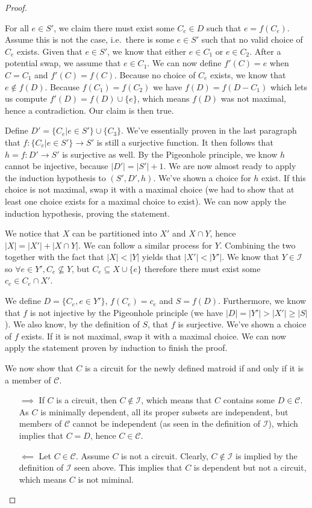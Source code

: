 \begin{proof}
\begin{enumerate}
\begin{enumerate}
            For all $e \in S'$, we claim there must exist some $C_e \in D$ such that $e = f(C_e)$. Assume this is not the case, i.e.\ there is some $e \in S'$ such that no valid choice of $C_e$ exists. Given that $e \in S'$, we know that either $e \in C_1$ or $e \in C_2$. After a potential swap, we assume that $e \in C_1$. We can now define $f'(C) = e$ when $C = C_1$ and $f'(C) = f(C)$. Because no choice of $C_e$ exists, we know that $e \not\in f(D)$. Because $f(C _1 ) = f(C _2 )$ we have $f(D) = f(D - C _1 )$ which lets us compute $f'(D) = f(D) \cup \{e\}$, which means $f(D)$ was not maximal, hence a contradiction. Our claim is then true.

            Define $D' = \{C_e | e \in S'\} \cup \{C _3 \}$. We've essentially proven in the last paragraph that $f : \{C_e | e \in S'\} \to S'$ is still a  surjective function. It then follows that $h = f : D' \to S'$ is surjective as well. By the Pigeonhole principle, we know $h$ cannot be injective, because $|D'| = |S'| + 1$. We are now almost ready to apply the induction hypothesis to $(S', D', h)$. We've shown a choice for $h$ exist. If this choice is not maximal, swap it with a maximal choice (we had to show that at least one choice exists for a maximal choice to exist). We can now apply the induction hypothesis, proving the statement.
    \end{enumerate}

    We notice that $X$ can be partitioned into $X'$ and $X \cap Y$, hence $|X| = |X'| + |X \cap Y|$. We can follow a similar process for $Y$. Combining the two together with the fact that $|X| < |Y|$ yields that $|X'| < |Y'|$. We know that $Y \in \mathcal I$ so $\forall e \in Y', C_e \not \subseteq  Y$, but $C_e \subseteq  X \cup \{e\}$ therefore there must exist some $c_e \in C_e \cap X'$. 

    We define $D = \{C_e, e \in Y'\}$, $f(C_e) = c_e$ and $S = f(D)$. Furthermore, we know that $f$ is not injective by the Pigeonhole principle (we have $|D| = |Y'| > |X'| \geq |S|$). We also know, by the definition of $S$, that $f$ is surjective. We've shown a choice of $f$ exists. If it is not maximal, swap it with a maximal choice. We can now apply the statement proven by induction to finish the proof.
\end{enumerate}


We now show that $C$ is a circuit for the newly defined matroid if and only if it is a member of $\mathcal C$. 
\begin{enumerate}
  \item[$\implies$]
  If $C$ is a circuit, then $C \not\in \mathcal I$, which means that $C$ contains some $D \in \mathcal C$. As $C$ is minimally dependent, all its proper subsets are independent, but members of $\mathcal C$ cannot be independent (as seen in the definition of $\mathcal I$), which implies that $C = D$, hence $C \in \mathcal C$.
  \item[$\impliedby$]
  Let $C \in \mathcal C$. Assume $C$ is not a circuit. Clearly, $C \not\in \mathcal I$ is implied by the definition of $\mathcal I$ seen above. This implies that $C$ is dependent but not a circuit, which means $C$ is not miminal. 


\end{enumerate}
\end{proof}
